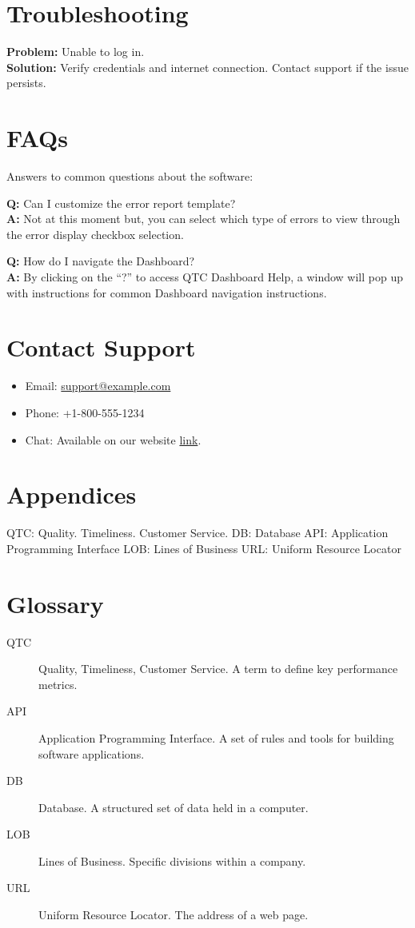 \documentclass[12pt]{article}
\begin{document}
\section{Troubleshooting}

\textbf{Problem:} Unable to log in.\\
\textbf{Solution:} Verify credentials and internet connection. Contact support if the issue persists.

\section{FAQs}
Answers to common questions about the software:

\textbf{Q:} Can I customize the error report template?\\
\textbf{A:} Not at this moment but, you can select which type of errors to view through the error display checkbox selection.

\textbf{Q:} How do I navigate the Dashboard?\\
\textbf{A:} By clicking on the “?” to access QTC Dashboard Help, a window will pop up with instructions for common Dashboard navigation instructions.

\section{Contact Support}

\begin{itemize}
    \item Email: \href{mailto:support@example.com}{support@example.com}
    \item Phone: +1-800-555-1234
    \item Chat: Available on our website \href{https://github.com/Armin2708/CS3338-Group4}{link}.
\end{itemize}

\section{Appendices}
QTC: Quality. Timeliness. Customer Service.  
DB: Database
API: Application Programming Interface
LOB: Lines of Business
URL: Uniform Resource Locator

\section{Glossary}
\begin{description}
    \item[QTC] Quality, Timeliness, Customer Service. A term to define key performance metrics.
    \item[API] Application Programming Interface. A set of rules and tools for building software applications.
    \item[DB] Database. A structured set of data held in a computer.
    \item[LOB] Lines of Business. Specific divisions within a company.
    \item[URL] Uniform Resource Locator. The address of a web page.
\end{description}
\end{document}

